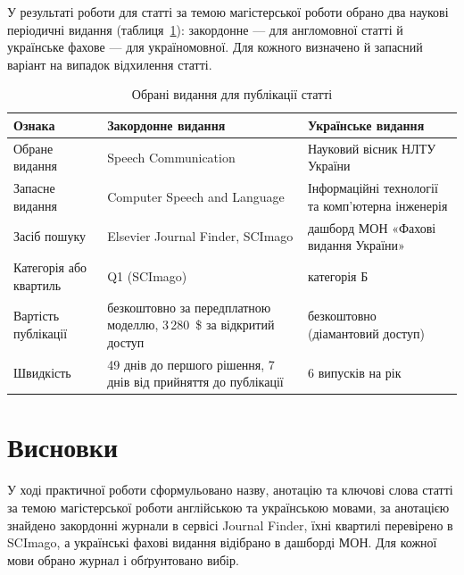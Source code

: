\documentclass[14pt,a4paper]{extreport}
\begin{document}
У результаті роботи для статті за темою магістерської роботи обрано два наукові періодичні видання (таблиця~\ref{tab:choice}): закордонне — для англомовної статті й українське фахове — для україномовної. Для кожного визначено й запасний варіант на випадок відхилення статті.

\begin{table}[H]
\caption{Обрані видання для публікації статті}
\label{tab:choice}
\small
\begin{tabularx}{\linewidth}{|l|X|X|}
\hline
\textbf{Ознака} & \textbf{Закордонне видання} & \textbf{Українське видання} \\
\hline
Обране видання & Speech Communication & Науковий вісник НЛТУ України \\
\hline
Запасне видання & Computer Speech and Language & Інформаційні технології та комп'ютерна інженерія \\
\hline
Засіб пошуку & Elsevier Journal Finder, SCImago & дашборд МОН «Фахові видання України» \\
\hline
Категорія або квартиль & Q1 (SCImago) & категорія Б \\
\hline
Вартість публікації & безкоштовно за передплатною моделлю, 3\,280~\$ за відкритий доступ & безкоштовно (діамантовий доступ) \\
\hline
Швидкість & 49 днів до першого рішення, 7 днів від прийняття до публікації & 6 випусків на рік \\
\hline
\end{tabularx}
\end{table}

\section{Висновки}

У ході практичної роботи сформульовано назву, анотацію та ключові слова статті за темою магістерської роботи англійською та українською мовами, за анотацією знайдено закордонні журнали в сервісі Journal Finder, їхні квартилі перевірено в SCImago, а українські фахові видання відібрано в дашборді МОН. Для кожної мови обрано журнал і обґрунтовано вибір.
\end{document}
